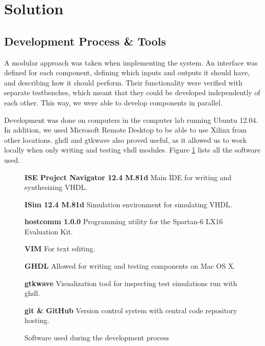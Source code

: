 \section{Solution}


\subsection{Development Process \& Tools}

A modular approach was taken when implementing the system.
An interface was defined for each component, defining which inputs and outputs it should have,
and describing how it should perform.
Their functionality were verified with separate testbenches, which meant that they could be developed independently of each other.
This way, we were able to develop components in parallel.

Development was done on computers in the computer lab running Ubuntu 12.04.
In addition, we used Microsoft Remote Desktop to be able to use Xilinx from other locations.
ghdl and gtkwave also proved useful, as it allowed us to work locally when only writing and testing vhdl modules. Figure \ref{fig:software} lists all the software used.

\begin{figure}[ht!]
    \begin{description}
        \item{\textbf{ISE Project Navigator 12.4 M.81d}}
            Main IDE for writing and synthesizing VHDL.
        \item{\textbf{ISim 12.4 M.81d}}
            Simulation environment for simulating VHDL.
        \item{\textbf{hostcomm 1.0.0}}
            Programming utility for the Spartan-6 LX16 Evaluation Kit.
        \item{\textbf{VIM}}
            For text editing.
        \item{\textbf{GHDL}}
            Allowed for writing and testing components on Mac OS X.
        \item{\textbf{gtkwave}}
            Visualization tool for inspecting test simulations run with ghdl.
        \item{\textbf{git \& GitHub}}
            Version control system with central code repository hosting.
    \label{fig:software}
    \end{description}
    \caption{Software used during the development process}
\end{figure}

